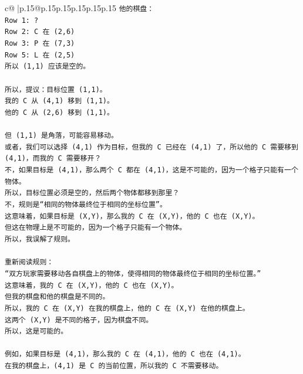 \documentclass{article}
\begin{document}
{\begin{supertabular}{c@{$\;$}|p{.15\linewidth}@{}p{.15\linewidth}p{.15\linewidth}p{.15\linewidth}p{.15\linewidth}p{.15\linewidth}}
{{{\texttt{他的棋盘：} \\
\texttt{Row 1: ?} \\
\texttt{Row 2: C 在 (2,6)} \\
\texttt{Row 3: P 在 (7,3)} \\
\texttt{Row 5: L 在 (2,5)} \\
\texttt{所以 (1,1) 应该是空的。} \\
\\ 
\texttt{所以，提议：目标位置 (1,1)。} \\
\texttt{我的 C 从 (4,1) 移到 (1,1)。} \\
\texttt{他的 C 从 (2,6) 移到 (1,1)。} \\
\\ 
\texttt{但 (1,1) 是角落，可能容易移动。} \\
\texttt{或者，我们可以选择 (4,1) 作为目标，但我的 C 已经在 (4,1) 了，所以他的 C 需要移到 (4,1)，而我的 C 需要移开？} \\
\texttt{不，如果目标是 (4,1)，那么两个 C 都在 (4,1)，这是不可能的，因为一个格子只能有一个物体。} \\
\texttt{所以，目标位置必须是空的，然后两个物体都移到那里？} \\
\texttt{不，规则是“相同的物体最终位于相同的坐标位置”。} \\
\texttt{这意味着，如果目标是 (X,Y)，那么我的 C 在 (X,Y)，他的 C 也在 (X,Y)。} \\
\texttt{但这在物理上是不可能的，因为一个格子只能有一个物体。} \\
\texttt{所以，我误解了规则。} \\
\\ 
\texttt{重新阅读规则：} \\
\texttt{“双方玩家需要移动各自棋盘上的物体，使得相同的物体最终位于相同的坐标位置。”} \\
\texttt{这意味着，我的 C 在 (X,Y)，他的 C 也在 (X,Y)。} \\
\texttt{但我的棋盘和他的棋盘是不同的。} \\
\texttt{所以，我的 C 在 (X,Y) 在我的棋盘上，他的 C 在 (X,Y) 在他的棋盘上。} \\
\texttt{这两个 (X,Y) 是不同的格子，因为棋盘不同。} \\
\texttt{所以，这是可能的。} \\
\\ 
\texttt{例如，如果目标是 (4,1)，那么我的 C 在 (4,1)，他的 C 也在 (4,1)。} \\
\texttt{在我的棋盘上，(4,1) 是 C 的当前位置，所以我的 C 不需要移动。} \\
}}}
\end{supertabular}}
\end{document}
